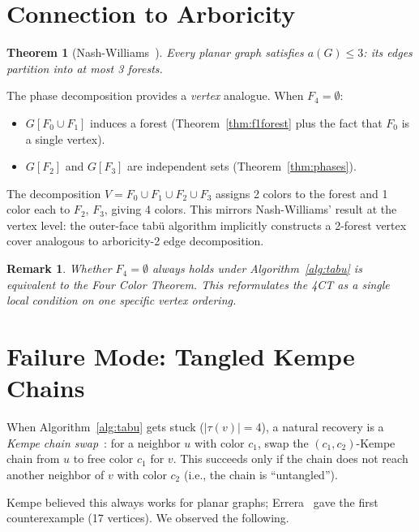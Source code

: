 \documentclass[11pt,twocolumn]{article}
\newtheorem{theorem}{Theorem}[section]
\newtheorem{remark}{Remark}
\begin{document}
\section{Connection to Arboricity}
\label{sec:arboricity}

\begin{theorem}[Nash-Williams~\cite{nashwilliams1961}]
Every planar graph satisfies $a(G)\leq 3$: its edges partition into at most 3
forests.
\end{theorem}

The phase decomposition provides a \emph{vertex} analogue. When $F_4=\emptyset$:
\begin{itemize}[noitemsep]
  \item $G[F_0\cup F_1]$ induces a forest (Theorem~\ref{thm:f1forest} plus the
        fact that $F_0$ is a single vertex).
  \item $G[F_2]$ and $G[F_3]$ are independent sets
        (Theorem~\ref{thm:phases}).
\end{itemize}

The decomposition $V=F_0\cup F_1\cup F_2\cup F_3$ assigns 2 colors to the
forest and 1 color each to $F_2$, $F_3$, giving 4 colors. This mirrors
Nash-Williams' result at the vertex level: the outer-face tab\"{u} algorithm
implicitly constructs a 2-forest vertex cover analogous to arboricity-2 edge
decomposition.

\begin{remark}
Whether $F_4=\emptyset$ always holds under Algorithm~\ref{alg:tabu} is
equivalent to the Four Color Theorem. This reformulates the 4CT as a single
local condition on one specific vertex ordering.
\end{remark}

\section{Failure Mode: Tangled Kempe Chains}
\label{sec:kempe}

When Algorithm~\ref{alg:tabu} gets stuck ($|\tau(v)|=4$), a natural recovery
is a \emph{Kempe chain swap}~\cite{kempe1879}: for a neighbor $u$ with color
$c_1$, swap the $(c_1,c_2)$-Kempe chain from $u$ to free color $c_1$ for $v$.
This succeeds only if the chain does not reach another neighbor of $v$ with
color $c_2$ (i.e., the chain is ``untangled'').

Kempe believed this always works for planar graphs; Errera~\cite{errera1921}
gave the first counterexample (17 vertices). We observed the following.
\end{document}
